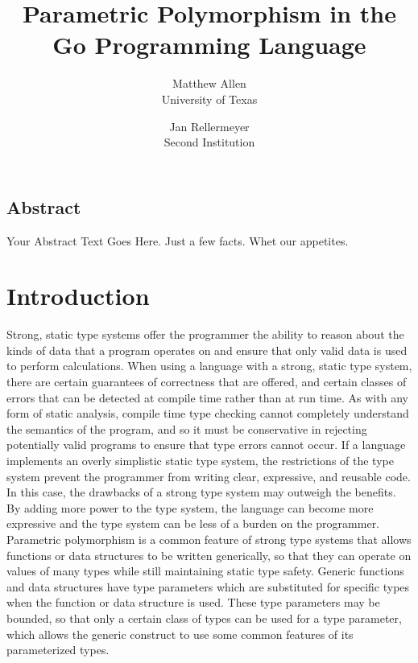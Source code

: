 \documentclass[letterpaper,twocolumn,11pt]{article}
\begin{document}
\date{}

\title{\Large \bf Parametric Polymorphism in the Go Programming Language}

\author{
  {\rm Matthew Allen}\\
  University of Texas
  \and
  {\rm Jan Rellermeyer}\\
  Second Institution
}

\maketitle

\thispagestyle{empty}


\subsection*{Abstract}
Your Abstract Text Goes Here.  Just a few facts.
Whet our appetites.

\section{Introduction} \label{introduction}

Strong, static type systems offer the programmer the ability to reason about the kinds of data that a program operates on and ensure that only valid data is used to perform calculations. When using a language with a strong, static type system, there are certain guarantees of correctness that are offered, and certain classes of errors that can be detected at compile time rather than at run time. As with any form of static analysis, compile time type checking cannot completely understand the semantics of the program, and so it must be conservative in rejecting potentially valid programs to ensure that type errors cannot occur. If a language implements an overly simplistic static type system, the restrictions of the type system prevent the programmer from writing clear, expressive, and reusable code. In this case, the drawbacks of a strong type system may outweigh the benefits. By adding more power to the type system, the language can become more expressive and the type system can be less of a burden on the programmer. Parametric polymorphism is a common feature of strong type systems that allows functions or data structures to be written generically, so that they can operate on values of many types while still maintaining static type safety. Generic functions and data structures have type parameters which are substituted for specific types when the function or data structure is used. These type parameters may be bounded, so that only a certain class of types can be used for a type parameter, which allows the generic construct to use some common features of its parameterized types.
\end{document}
